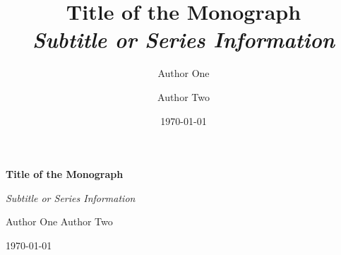 \documentclass[letterpaper,12pt,oneside,openany]{memoir}
\title{%
  \Huge\bfseries Title of the Monograph\\[0.5cm]
  \Large\itshape Subtitle or Series Information%
}
\author{Author One \and Author Two}
\date{\today}
\begin{document}
\frontmatter

\begin{titlingpage}
  \centering
  \vspace*{4cm}
  {\Huge\bfseries Title of the Monograph\par}
  \vspace{1cm}
  {\Large\itshape Subtitle or Series Information\par}
  \vspace{3cm}
  {\large Author One \quad Author Two\par}
  \vfill
  {\large \today\par}
\end{titlingpage}

\tableofcontents*
\clearpage

\mainmatter






\backmatter

\printbibliography[heading=bibintoc]
\end{document}
